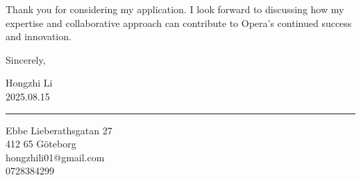 \documentclass[a4paper,10pt]{article}
\begin{document}
Thank you for considering my application. I look forward to discussing how my expertise and collaborative approach can contribute to Opera's continued success and innovation.

\vspace{20pt}

Sincerely,

Hongzhi Li\\
2025.08.15

\vspace{40pt}

{\color{darkblue}\rule{\linewidth}{0.6pt}}

\vspace{4pt}

{\color{darkblue}
Ebbe Lieberathsgatan 27\\
412 65 Göteborg\\
hongzhili01@gmail.com\\
0728384299}
\end{document}
